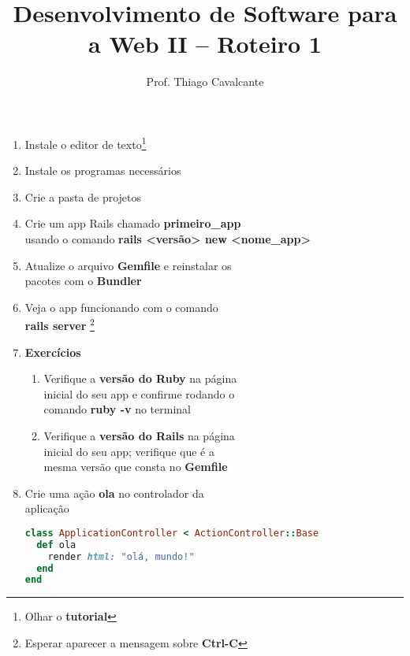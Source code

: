 \documentclass[a4paper,12pt]{article}
\title{Desenvolvimento de Software para a Web II -- Roteiro 1}
\author{Prof. Thiago Cavalcante}
\date{}
\begin{document}
\maketitle

\sloppy
\raggedright

\begin{enumerate}
  \item Instale o editor de texto\footnote{Olhar o \textbf{tutorial}}
  \item Instale os programas necessários\footnotemark[1]
  \item Crie a pasta de projetos\footnotemark[1]
  \item Crie um app Rails chamado \textbf{primeiro\_app} \\
        usando o comando \textbf{rails <versão> new <nome\_app>}\footnotemark[1]
  \item Atualize o arquivo \textbf{Gemfile} e reinstalar os \\
        pacotes com o \textbf{Bundler}\footnotemark[1]
  \item Veja o app funcionando com o comando \\
        \textbf{rails server}%
        \footnote[7]{Esperar aparecer a mensagem sobre \textbf{Ctrl-C}}
  \item \textbf{Exercícios}

    \begin{enumerate}
      \item Verifique a \textbf{versão do Ruby} na página \\
            inicial do seu app e confirme rodando o \\
            comando \textbf{ruby -v} no terminal
      \item Verifique a \textbf{versão do Rails} na página \\
            inicial do seu app; verifique que é a \\
            mesma versão que consta no \textbf{Gemfile}
    \end{enumerate}

  \item Crie uma ação \textbf{ola} no controlador da \\
        aplicação

    \begin{lstlisting}[language=Ruby, title=app/controllers/application\_controller.rb]
class ApplicationController < ActionController::Base
  def ola
    render html: "olá, mundo!"
  end
end
    \end{lstlisting}


\end{enumerate}
\end{document}
